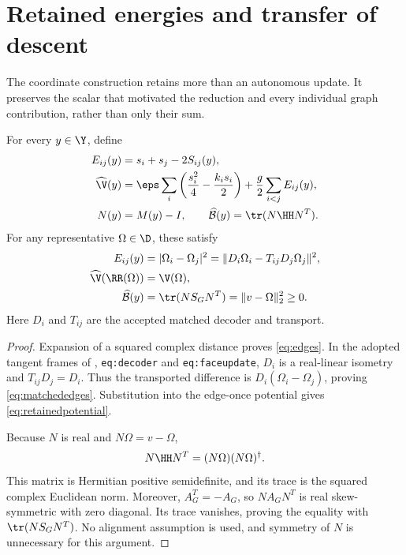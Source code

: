 \section{Retained energies and transfer of descent}\label{sec:retention}

The coordinate construction retains more than an autonomous update. It preserves the scalar that motivated the reduction and every individual graph contribution, rather than only their sum.

\begin{theorem}\label{thm:retention}
For every \(y\in\Y\), define
\begin{align}
E_{ij}(y)&=s_i+s_j-2S_{ij}(y),\label{eq:edges}\\
\widehat{\V}(y)&=\eps\sum_i\left(\frac{s_i^2}{4}-\frac{k_i s_i}{2}\right)
+\frac g2\sum_{i<j}E_{ij}(y),\label{eq:retainedpotential}\\
N(y)&=M(y)-I,\qquad
\widehat{\mathcal B}(y)=\tr(N\HH N^T).
\label{eq:retainedB}
\end{align}
For any representative \(\Omega\in\D\), these satisfy
\begin{align}
E_{ij}(y)&=|\Omega_i-\Omega_j|^2
=\|D_i\Omega_i-T_{ij}D_j\Omega_j\|^2,\label{eq:matchededges}\\
\widehat{\V}(\RR(\Omega))&=\V(\Omega),\notag\\
\widehat{\mathcal B}(y)
&=\tr(NS_GN^T)=\|v-\Omega\|_2^2\ge0.
\label{eq:traceidentity}
\end{align}
Here \(D_i\) and \(T_{ij}\) are the accepted matched decoder and transport.
\end{theorem}
\begin{proof}
Expansion of a squared complex distance proves \eqref{eq:edges}. In the adopted tangent frames of \cite{nrg}, \texttt{eq:decoder} and \texttt{eq:faceupdate}, \(D_i\) is a real-linear isometry and \(T_{ij}D_j=D_i\). Thus the transported difference is \(D_i(\Omega_i-\Omega_j)\), proving \eqref{eq:matchededges}. Substitution into the edge-once potential gives \eqref{eq:retainedpotential}.

Because \(N\) is real and \(N\Omega=v-\Omega\),
\[
N\HH N^T=(N\Omega)(N\Omega)^\dagger.
\]
This matrix is Hermitian positive semidefinite, and its trace is the squared complex Euclidean norm. Moreover, \(A_G^T=-A_G\), so \(NA_GN^T\) is real skew-symmetric with zero diagonal. Its trace vanishes, proving the equality with \(\tr(NS_GN^T)\). No alignment assumption is used, and symmetry of \(N\) is unnecessary for this argument.
\end{proof}

